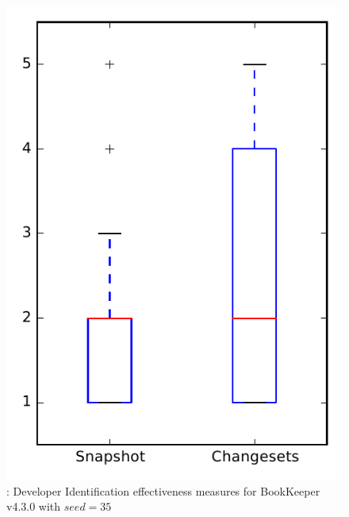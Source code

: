 
\begin{figure}
\centering
\includegraphics[height=0.4\textheight]{figures/dit_seed/rq1_bookkeeper_35}
\caption{\rtwo: Developer Identification effectiveness measures for BookKeeper v4.3.0 with $seed=35$}
\label{fig:dit_seed:rq1:bookkeeper}
\end{figure}

